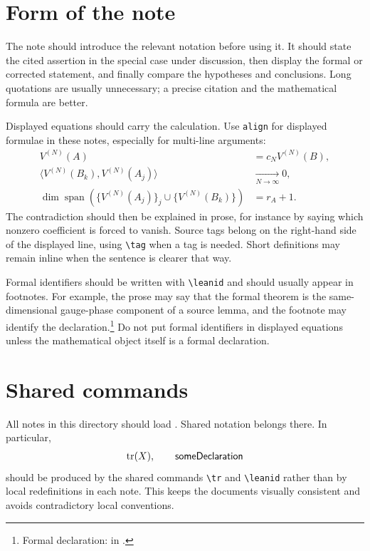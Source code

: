 \documentclass{article}
\begin{document}
\section{Form of the note}

The note should introduce the relevant notation before using it. It should
state the cited assertion in the special case under discussion, then display the
formal or corrected statement, and finally compare the hypotheses and
conclusions. Long quotations are usually unnecessary; a precise citation and
the mathematical formula are better.

Displayed equations should carry the calculation. Use \verb|align| for
displayed formulae in these notes, especially for multi-line arguments:
\begin{align}
    V^{(N)}(A) &= c_N V^{(N)}(B),\\
    \langle V^{(N)}(B_k),V^{(N)}(A_j)\rangle
               &\xrightarrow[N\to\infty]{}0,\\
    \dim\operatorname{span}
    \left(\{V^{(N)}(A_j)\}_j\cup\{V^{(N)}(B_k)\}\right)
               &= r_A+1.
\end{align}
The contradiction should then be explained in prose, for instance by saying
which nonzero coefficient is forced to vanish.
Source tags belong on the right-hand side of the displayed line, using
\verb|\tag| when a tag is needed. Short definitions may remain inline when the
sentence is clearer that way.

Formal identifiers should be written with \verb|\leanid| and should usually
appear in footnotes. For example, the prose may say that the formal theorem is
the same-dimensional gauge-phase component of a source lemma, and the footnote
may identify the declaration.\footnote{Formal declaration:
    in .}
Do not put formal identifiers in displayed equations unless the mathematical
object itself is a formal declaration.

\section{Shared commands}

All notes in this directory should load .
Shared notation belongs there. In particular,
\begin{align}
    \tr(X),\qquad \leanid{someDeclaration}
\end{align}
should be produced by the shared commands \verb|\tr| and \verb|\leanid| rather
than by local redefinitions in each note. This keeps the documents visually
consistent and avoids contradictory local conventions.
\end{document}
